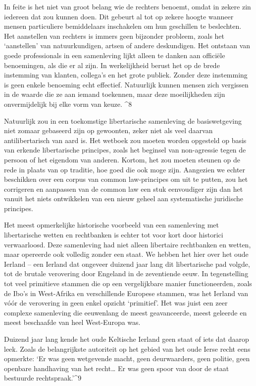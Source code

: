 \documentclass[
  a5paper,
  smalldemyvopaper,10pt,twoside,onecolumn,openright,extrafontsizes,hidelinks]{memoir}
\renewenvironment{quote}%
               {\list{}{\rightmargin=.6cm\leftmargin=.6cm}%
                \itshape \item[]}%
               {\endlist}
\begin{document}
\begin{quote}
In feite is het niet van groot belang wie de rechters benoemt, omdat in
zekere zin iedereen dat zou kunnen doen. Dit gebeurt al tot op zekere
hoogte wanneer mensen particuliere bemiddelaars inschakelen om hun
geschillen te beslechten. Het aanstellen van rechters is immers geen
bijzonder probleem, zoals het `aanstellen' van natuurkundigen, artsen of
andere deskundigen. Het ontstaan van goede professionals in een
samenleving lijkt alleen te danken aan officiële benoemingen, als die er
al zijn. In werkelijkheid berust het op de brede instemming van klanten,
collega's en het grote publiek. Zonder deze instemming is geen enkele
benoeming echt effectief. Natuurlijk kunnen mensen zich vergissen in de
waarde die ze aan iemand toekennen, maar deze moeilijkheden zijn
onvermijdelijk bij elke vorm van keuze. \^{}8
\end{quote}

Natuurlijk zou in een toekomstige libertarische samenleving de
basiswetgeving niet zomaar gebaseerd zijn op gewoonten, zeker niet als
veel daarvan antilibertarisch van aard is. Het wetboek zou moeten worden
opgesteld op basis van erkende libertarische principes, zoals het
beginsel van non-agressie tegen de persoon of het eigendom van anderen.
Kortom, het zou moeten steunen op de rede in plaats van op traditie, hoe
goed die ook moge zijn. Aangezien we echter beschikken over een corpus
van common law-principes om uit te putten, zou het corrigeren en
aanpassen van de common law een stuk eenvoudiger zijn dan het vanuit het
niets ontwikkelen van een nieuw geheel aan systematische juridische
principes.

Het meest opmerkelijke historische voorbeeld van een samenleving met
libertarische wetten en rechtbanken is echter tot voor kort door
historici verwaarloosd. Deze samenleving had niet alleen libertaire
rechtbanken en wetten, maar opereerde ook volledig zonder een staat. We
hebben het hier over het oude Ierland -- een Ierland dat ongeveer
duizend jaar lang dit libertarische pad volgde, tot de brutale
verovering door Engeland in de zeventiende eeuw. In tegenstelling tot
veel primitieve stammen die op een vergelijkbare manier functioneerden,
zoals de Ibo's in West-Afrika en verschillende Europese stammen, was het
Ierland van vóór de verovering in geen enkel opzicht `primitief'. Het
was juist een zeer complexe samenleving die eeuwenlang de meest
geavanceerde, meest geleerde en meest beschaafde van heel West-Europa
was.

Duizend jaar lang kende het oude Keltische Ierland geen staat of iets
dat daarop leek. Zoals de belangrijkste autoriteit op het gebied van het
oude Ierse recht eens opmerkte: `Er was geen wetgevende macht, geen
deurwaarders, geen politie, geen openbare handhaving van het
recht\ldots{} Er was geen spoor van door de staat bestuurde
rechtspraak.'\^{}9
\end{document}
